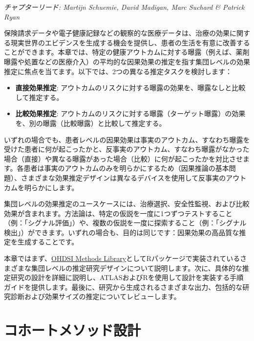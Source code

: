 \documentclass[
  11pt]{book}
\providecommand{\tightlist}{%
  \setlength{\itemsep}{0pt}\setlength{\parskip}{0pt}}
\theoremstyle{definition}
\theoremstyle{definition}
\theoremstyle{definition}
\theoremstyle{definition}
\theoremstyle{remark}
\begin{document}
\emph{チャプターリード: Martijn Schuemie, David Madigan, Marc Suchard \& Patrick Ryan}


保険請求データや電子健康記録などの観察的な医療データは、治療の効果に関する現実世界のエビデンスを生成する機会を提供し、患者の生活を有意に改善することができます。本章では、特定の健康アウトカムに対する曝露（例えば、薬剤曝露や処置などの医療介入）の平均的な因果効果の推定を指す集団レベルの効果推定に焦点を当てます。以下では、2つの異なる推定タスクを検討します：

\begin{itemize}
\tightlist
\item
  \textbf{直接効果推定}: アウトカムのリスクに対する曝露の効果を、曝露なしと比較して推定する。 
\item
  \textbf{比較効果推定}: アウトカムのリスクに対する曝露（ターゲット曝露）の効果を、別の曝露（比較曝露）と比較して推定する。 
\end{itemize}

いずれの場合でも、患者レベルの因果効果は事実のアウトカム、すなわち曝露を受けた患者に何が起こったかと、反事実のアウトカム、すなわち曝露がなかった場合（直接）や異なる曝露があった場合（比較）に何が起こったかを対比させます。各患者は事実のアウトカムのみを明らかにするため（因果推論の基本問題）、さまざまな効果推定デザインは異なるデバイスを使用して反事実のアウトカムを明らかにします。 

集団レベルの効果推定のユースケースには、治療選択、安全性監視、および比較効果が含まれます。方法論は、特定の仮説を一度に1つずつテストすること（例：「シグナル評価」）や、複数の仮説を一度に探索すること（例：「シグナル検出」）ができます。いずれの場合も、目的は同じです：因果効果の高品質な推定を生成することです。  

本章ではまず、\href{https://ohdsi.github.io/MethodsLibrary/}{OHDSI Methods Library}としてRパッケージで実装されているさまざまな集団レベルの推定研究デザインについて説明します。次に、具体的な推定研究の設計を詳細に説明し、ATLASおよびRを使用して設計を実装する手順ガイドを提供します。最後に、研究から生成されるさまざまな出力、包括的な研究診断および効果サイズの推定についてレビューします。

\section{コホートメソッド設計}\label{CohortMethod}
\end{document}
